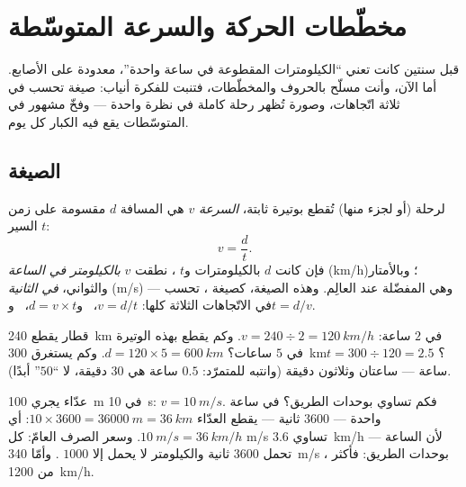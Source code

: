\chapter{مخطّطات الحركة والسرعة المتوسّطة}\label{ch:g7:motion-average-speed}

قبل سنتين كانت  تعني ``الكيلومترات المقطوعة في ساعة
واحدة''، معدودة على الأصابع. أما الآن، وأنت مسلّح بالحروف
والمخطّطات، فتنبت للفكرة أنياب: صيغة تحسب في ثلاثة اتّجاهات،
وصورة تُظهر رحلة كاملة في نظرة واحدة --- وفخّ مشهور في المتوسّطات
يقع فيه الكبار كل يوم.

\section{الصيغة}

\begin{definition}\label{def:g7:motion-average-speed:formula}
لرحلة (أو لجزء منها) تُقطع بوتيرة ثابتة، \emph{السرعة}
$v$ هي المسافة $d$ مقسومة على زمن السير $t$:
\[
v = \frac{d}{t}.
\]
فإن كانت $d$ بالكيلومترات و$t$ ، نطقت $v$
\emph{بالكيلومتر في الساعة} (\unit{km/h})؛ وبالأمتار والثواني،
\emph{ في الثانية} (\unit{m/s}) --- وهي المفضّلة عند
العالِم. وهذه الصيغة، كصيغة ، تحسب في الاتّجاهات الثلاثة
كلها: $v = d/t$، \ و$d = v \times t$، \ و$t = d/v$.
\end{definition}

\begin{example}\label{ex:g7:motion-average-speed:recipes}
قطار يقطع \qty{240}{km} في $2$ ساعة: $v = 240 \div 2 =
\qty{120}{km/h}$. وكم يقطع بهذه الوتيرة في $5$ ساعات؟ $d = 120
\times 5 = \qty{600}{km}$. وكم يستغرق \qty{300}{km}؟ $t = 300
\div 120 = 2.5$ ساعة --- ساعتان وثلاثون دقيقة (وانتبه للمتمرّد:
$0.5$ ساعة هي $30$ دقيقة، لا ``$50$'' أبدًا).
\end{example}

\begin{example}\label{ex:g7:motion-average-speed:units}
عدّاء يجري \qty{100}{m} في \qty{10}{s}: $v = \qty{10}{m/s}$.
فكم تساوي بوحدات الطريق؟ في ساعة واحدة --- $3600$ ثانية ---
يقطع العدّاء $10 \times 3600 = \qty{36000}{m} = \qty{36}{km}$:
أي $\qty{10}{m/s} = \qty{36}{km/h}$. وسعر الصرف العامّ: كل
\unit{m/s} تساوي \qty{3.6}{km/h} --- لأن الساعة تحمل $3600$
ثانية والكيلومتر لا يحمل إلا $1000$ . وأمّا \qty{340}{m/s}
، بوحدات الطريق: فأكثر من \qty{1200}{km/h}.
\end{example}


